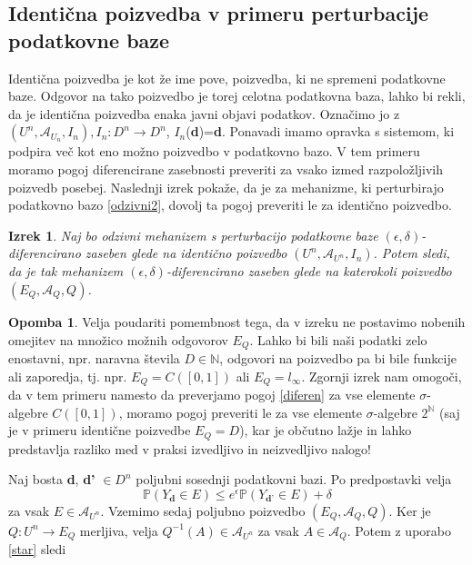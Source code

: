 \documentclass[12pt,a4paper]{amsart}
\theoremstyle{definition} %
\newtheorem{opomba}[definicija]{Opomba}
\theoremstyle{plain} %
\newtheorem{izrek}[definicija]{Izrek}
\begin{document}
\subsection{Identična poizvedba v primeru perturbacije podatkovne baze}
Identična poizvedba je kot že ime pove, poizvedba, ki ne spremeni podatkovne baze. Odgovor na tako poizvedbo je torej celotna podatkovna baza, lahko bi rekli, da je identična poizvedba enaka javni objavi podatkov. Označimo jo z $(U^n, \mathcal{A}_{U_n}, I_n), I_n : D^n \rightarrow D^n$, $I_n$(\textbf{d})=\textbf{d}. 
\newline
\newline
Ponavadi imamo opravka s sistemom, ki podpira več kot eno možno poizvedbo v podatkovno bazo. V tem primeru moramo pogoj diferencirane zasebnosti preveriti za vsako izmed razpoložljivih poizvedb posebej. Naslednji izrek pokaže, da je za mehanizme, ki perturbirajo podatkovno bazo \eqref{odzivni2}, dovolj ta pogoj preveriti le za identično poizvedbo.
\begin{izrek} 
Naj bo odzivni mehanizem s perturbacijo podatkovne baze  $(\epsilon , \delta)$-diferencirano zaseben glede na identično poizvedbo $(U^n, \mathcal{A}_{U^n}, I_n)$. Potem sledi, da je tak mehanizem $(\epsilon , \delta)$-diferencirano zaseben glede na katerokoli poizvedbo $(E_Q, \mathcal{A}_Q, Q)$.
\end{izrek}
\begin{opomba} Velja poudariti pomembnost tega, da v izreku ne postavimo nobenih omejitev na množico možnih odgovorov $E_Q$.  Lahko bi bili naši podatki zelo enostavni, npr. naravna števila $D \in \mathbb{N}$, odgovori na poizvedbo pa bi bile funkcije ali zaporedja, tj. npr. $E_Q = C([0,1])$ ali $E_Q = l_\infty$. Zgornji izrek nam omogoči, da v tem primeru namesto da preverjamo pogoj \eqref{diferen} za vse elemente $\sigma$-algebre $C([0,1])$, moramo pogoj preveriti le za vse elemente $\sigma$-algebre $2^{\mathbb{N}}$ (saj je v primeru identične poizvedbe $E_Q=D$), kar je občutno lažje in lahko predstavlja razliko med v praksi izvedljivo in neizvedljivo nalogo!
\end{opomba}
\proof 
Naj bosta \textbf{d}, \textbf{d'} $\in D^n$ poljubni sosednji podatkovni bazi. Po predpostavki velja 
\begin{equation}\label{star}
\mathbb{P}(Y_{\textbf{d}} \in E) \leq e^\epsilon \mathbb{P}(Y_{\textbf{d'}} \in E) + \delta \tag {*}
\end{equation}
za vsak $E \in \mathcal{A}_{U^n}$. Vzemimo sedaj poljubno poizvedbo $(E_Q, \mathcal{A}_Q, Q)$. Ker je $Q: U^n \rightarrow E_Q$ merljiva, velja  $Q^{-1}(A)\in \mathcal{A}_{U^n}$ za vsak $A \in \mathcal{A}_Q$. Potem z uporabo \eqref{star} sledi 
\end{document}
